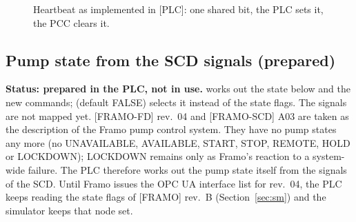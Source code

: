 \documentclass[11pt,a4paper]{article}
\begin{document}
\begin{figure}[htbp]
\centering
{}
\caption{Heartbeat as implemented in [PLC]: one shared bit, the PLC sets it, the PCC clears it.}
\label{fig:hb}
\end{figure}

\subsection{Pump state from the SCD signals (prepared)}
\label{sec:scdstate}
\textbf{Status: prepared in the PLC, not in use.}  works out the state below and
 the new commands;  (default FALSE) selects it
instead of the state flags. The signals are not mapped yet. [FRAMO-FD] rev.~04 and [FRAMO-SCD] A03 are taken as the
description of the Framo pump control system. They have no pump states any more (no UNAVAILABLE,
AVAILABLE, START, STOP, REMOTE, HOLD or LOCKDOWN); LOCKDOWN remains only as Framo's reaction to a
system-wide failure. The PLC therefore works out the pump state itself from the signals of the SCD. Until
Framo issues the OPC UA interface list for rev.~04, the PLC keeps reading the state flags of [FRAMO]
rev.~B (Section~\ref{sec:sm}) and the simulator keeps that node set.
\end{document}
